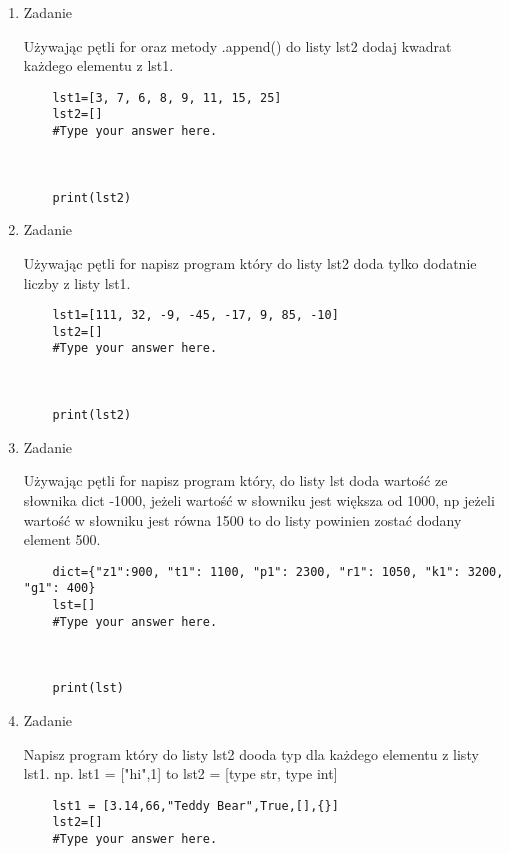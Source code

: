 \documentclass[11pt]{article}
\begin{document}
\begin{enumerate}
\item 
\begin{Large}
	Zadanie
\end{Large}
\par
Używając pętli for oraz metody .append() do listy lst2 dodaj kwadrat każdego elementu z lst1.
\begin{lstlisting}
	lst1=[3, 7, 6, 8, 9, 11, 15, 25]
	lst2=[]
	#Type your answer here.
	
	
	
	print(lst2)
\end{lstlisting}

\item 
\begin{Large}
	Zadanie
\end{Large}
\par
Używając pętli for napisz program który do listy lst2 doda tylko dodatnie liczby z listy lst1.
\begin{lstlisting}
	lst1=[111, 32, -9, -45, -17, 9, 85, -10]
	lst2=[]
	#Type your answer here.
	
	
	
	print(lst2)
\end{lstlisting}

\item 
\begin{Large}
	Zadanie
\end{Large}
\par
Używając pętli for napisz program który, do listy lst doda wartość ze słownika dict -1000, jeżeli wartość w słowniku jest większa od 1000, np jeżeli wartość w słowniku jest równa 1500 to do listy powinien zostać dodany element 500.
\begin{lstlisting}
	dict={"z1":900, "t1": 1100, "p1": 2300, "r1": 1050, "k1": 3200, "g1": 400}
	lst=[]
	#Type your answer here.
	
	
	
	print(lst)
\end{lstlisting}

\item 
\begin{Large}
	Zadanie
\end{Large}
\par
Napisz program który do listy lst2 dooda typ dla każdego elementu z listy lst1. np. lst1 = ["hi",1] to lst2 = [type str, type int]

\begin{lstlisting}
	lst1 = [3.14,66,"Teddy Bear",True,[],{}]
	lst2=[]
	#Type your answer here.
	

\end{lstlisting}
\end{enumerate}
\end{document}
